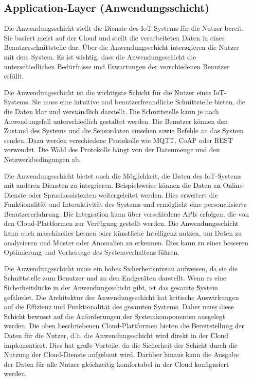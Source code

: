 \documentclass[12pt, a4paper]{article}
\begin{document}
\subsection{Application-Layer (Anwendungsschicht)}
\par Die Anwendungsschicht stellt die Dienste des IoT-Systems für die Nutzer bereit. Sie basiert meist auf der Cloud und stellt die verarbeiteten Daten in einer Benutzerschnittstelle dar. Über die Anwendungsschicht interagieren die Nutzer mit dem System. Es ist wichtig, dass die Anwendungsschicht die unterschiedlichen Bedürfnisse und Erwartungen der verschiedenen Benutzer erfüllt.
\par Die Anwendungsschicht ist die wichtigste Schicht für die Nutzer eines IoT-Systems. Sie muss eine intuitive und benutzerfreundliche Schnittstelle bieten, die die Daten klar und verständlich darstellt. Die Schnittstelle kann je nach Anwendungsfall unterschiedlich gestaltet werden. Die Benutzer können den Zustand des Systems und die Sensordaten einsehen sowie Befehle an das System senden. Dazu werden verschiedene Protokolle wie MQTT, CoAP oder REST verwendet. Die Wahl des Protokolls hängt von der Datenmenge und den Netzwerkbedingungen ab.
\par Die Anwendungsschicht bietet auch die Möglichkeit, die Daten des IoT-Systems mit anderen Diensten zu integrieren. Beispielsweise können die Daten an Online-Dienste oder Sprachassistenten weitergeleitet werden. Dies erweitert die Funktionalität und Interaktivität des Systems und ermöglicht eine personalisierte Benutzererfahrung. Die Integration kann über verschiedene APIs erfolgen, die von den Cloud-Plattformen zur Verfügung gestellt werden. Die Anwendungsschicht kann auch maschinelles Lernen oder künstliche Intelligenz nutzen, um Daten zu analysieren und Muster oder Anomalien zu erkennen. Dies kann zu einer besseren Optimierung und Vorhersage des Systemverhaltens führen.
\par Die Anwendungsschicht muss ein hohes Sicherheitsniveau aufweisen, da sie die Schnittstelle zum Benutzer und zu den Endgeräten darstellt. Wenn es eine Sicherheitslücke in der Anwendungsschicht gibt, ist das gesamte System gefährdet. Die Architektur der Anwendungsschicht hat kritische Auswirkungen auf die Effizienz und Funktionalität des gesamten Systems. Daher muss diese Schicht bewusst auf die Anforderungen der Systemkomponenten ausgelegt werden. Die oben beschriebenen Cloud-Plattformen bieten die Bereitstellung der Daten für die Nutzer, d.h. die Anwendungsschicht wird direkt in der Cloud implementiert. Dies hat große Vorteile, da die Sicherheit der Schicht durch die Nutzung der Cloud-Dienste aufgebaut wird. Darüber hinaus kann die Ausgabe der Daten für alle Nutzer gleichzeitig komfortabel in der Cloud konfiguriert werden.
\pagebreak
\end{document}
